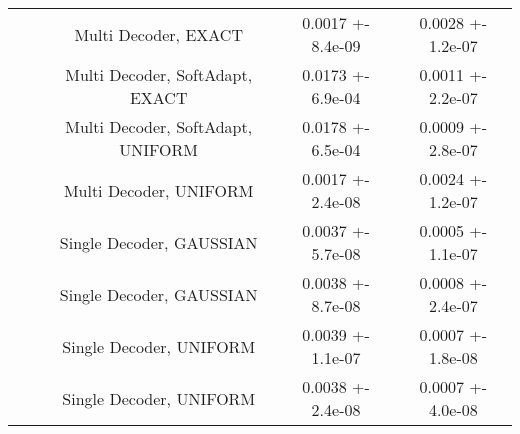 \begin{center}
\begin{tabular}{||c|c|c|c|c||}
\cline{3-5}
 &  & Multi Decoder, EXACT & 0.0017 +- 8.4e-09 & 0.0028 +- 1.2e-07 \\
\cline{3-5}
 &  & Multi Decoder, SoftAdapt, EXACT & 0.0173 +- 6.9e-04 & 0.0011 +- 2.2e-07 \\
\cline{3-5}
 &  & Multi Decoder, SoftAdapt, UNIFORM & 0.0178 +- 6.5e-04 & 0.0009 +- 2.8e-07 \\
\cline{3-5}
 &  & Multi Decoder, UNIFORM & 0.0017 +- 2.4e-08 & 0.0024 +- 1.2e-07 \\
\cline{3-5}
 &  & Single Decoder, GAUSSIAN & 0.0037 +- 5.7e-08 & 0.0005 +- 1.1e-07 \\
\cline{3-5}
 &  & Single Decoder, GAUSSIAN & 0.0038 +- 8.7e-08 & 0.0008 +- 2.4e-07 \\
\cline{3-5}
 &  & Single Decoder, UNIFORM & 0.0039 +- 1.1e-07 & 0.0007 +- 1.8e-08 \\
\cline{3-5}
 &  & Single Decoder, UNIFORM & 0.0038 +- 2.4e-08 & 0.0007 +- 4.0e-08 \\
\cline{2-5}
\hline
\end{tabular}
\end{center}
